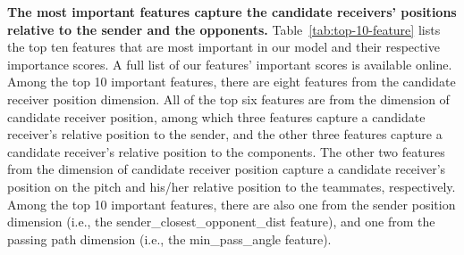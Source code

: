 \textbf{The most important features capture the candidate receivers' positions relative to the sender and the opponents.}
Table~\ref{tab:top-10-feature} lists the top ten features that are most important in our model and their respective importance scores.
A full list of our features' important scores is available online\footnotemark[\ref{feature-list}].
Among the top 10 important features, there are eight features from the candidate receiver position dimension. %
All of the top six features are from the dimension of candidate receiver position, among which three features capture a candidate receiver's relative position to the sender, and the other three features capture a candidate receiver's relative position to the components.
The other two features from the dimension of candidate receiver position capture a candidate receiver's position on the pitch and his/her relative position to the teammates, respectively.
Among the top 10 important features, there are also one from the sender position dimension (i.e., the sender\_closest\_opponent\_dist feature), and one from the passing path dimension (i.e., the min\_pass\_angle feature).

